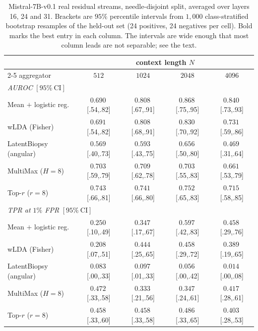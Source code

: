 \documentclass[10pt]{article}
\theoremstyle{plain}
\theoremstyle{definition}
\theoremstyle{remark}
\begin{document}
\begin{table}[t]
\centering\footnotesize
\setlength{\tabcolsep}{3.5pt}
\begin{tabular}{lcccc}
\toprule
& \multicolumn{4}{c}{context length $N$}\\
\cmidrule(lr){2-5}
aggregator & $512$ & $1024$ & $2048$ & $4096$\\
\midrule
\multicolumn{5}{l}{\emph{AUROC} $[95\%\ \mathrm{CI}]$}\\
Mean $+$ logistic reg. & $0.690${\tiny\,[.54,.82]} & $0.808${\tiny\,[.67,.91]}
  & $\mathbf{0.868}${\tiny\,[.75,.95]} & $\mathbf{0.840}${\tiny\,[.73,.93]}\\
wLDA (Fisher)          & $0.691${\tiny\,[.54,.82]} & $\mathbf{0.808}${\tiny\,[.68,.91]}
  & $0.830${\tiny\,[.70,.92]} & $0.731${\tiny\,[.59,.86]}\\
LatentBiopsy (angular) & $0.569${\tiny\,[.40,.73]} & $0.593${\tiny\,[.43,.75]}
  & $0.656${\tiny\,[.50,.80]} & $0.469${\tiny\,[.31,.64]}\\
MultiMax ($H{=}8$)     & $0.703${\tiny\,[.59,.79]} & $0.709${\tiny\,[.62,.78]}
  & $0.703${\tiny\,[.55,.83]} & $0.661${\tiny\,[.53,.79]}\\
Top-$r$ ($r{=}8$)      & $\mathbf{0.743}${\tiny\,[.66,.81]} & $0.741${\tiny\,[.66,.80]}
  & $0.752${\tiny\,[.65,.83]} & $0.715${\tiny\,[.58,.85]}\\
\midrule
\multicolumn{5}{l}{\emph{TPR at $1\%$ FPR} $[95\%\ \mathrm{CI}]$}\\
Mean $+$ logistic reg. & $0.250${\tiny\,[.10,.49]} & $0.347${\tiny\,[.17,.67]}
  & $\mathbf{0.597}${\tiny\,[.42,.83]} & $\mathbf{0.458}${\tiny\,[.29,.76]}\\
wLDA (Fisher)          & $0.208${\tiny\,[.07,.51]} & $0.444${\tiny\,[.25,.65]}
  & $0.458${\tiny\,[.29,.72]} & $0.389${\tiny\,[.19,.65]}\\
LatentBiopsy (angular) & $0.083${\tiny\,[.00,.33]} & $0.097${\tiny\,[.01,.33]}
  & $0.056${\tiny\,[.00,.42]} & $0.014${\tiny\,[.00,.08]}\\
MultiMax ($H{=}8$)     & $\mathbf{0.472}${\tiny\,[.33,.58]} & $0.333${\tiny\,[.21,.56]}
  & $0.347${\tiny\,[.24,.61]} & $0.417${\tiny\,[.28,.61]}\\
Top-$r$ ($r{=}8$)      & $0.458${\tiny\,[.33,.60]} & $\mathbf{0.458}${\tiny\,[.33,.58]}
  & $0.486${\tiny\,[.33,.65]} & $0.403${\tiny\,[.28,.53]}\\
\bottomrule
\end{tabular}
\setlength{\tabcolsep}{6pt}
\caption{Mistral-7B-v0.1 real residual streams, needle-disjoint split, averaged over
layers 16, 24 and 31. Brackets are $95\%$ percentile intervals from $1{,}000$
class-stratified bootstrap resamples of the held-out set (24 positives, 24 negatives per
cell). Bold marks the best entry in each column. The intervals are wide enough that most
column leads are not separable; see the text.}
\label{tab:realllm}
\end{table}
\end{document}
